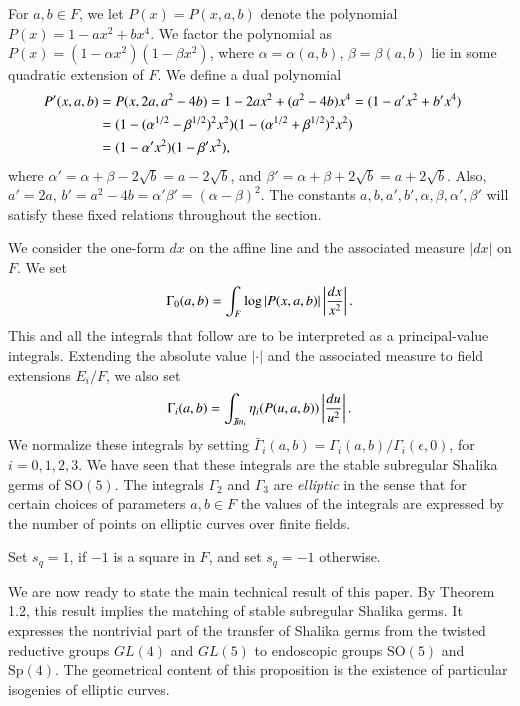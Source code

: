 \documentclass{amsart}
\newcommand\leftd[1]{\left | {d#1\over #1^2}\right |}
\newcommand\leftdx{\leftd x}
\newcommand\leftdu{\leftd u}
\newcommand\Imm{{\mathcal I\hskip-.2em m}}
\newcommand\bGamma{\bar\Gamma}
\begin{document}
For $a,b\in F$, we let $P(x) = P(x,a,b)$ denote the polynomial
$P(x) = 1-ax^2 + bx^4$.  We factor the polynomial as
$P(x) = (1-\alpha x^2)(1-\beta x^2)$, where $\alpha=\alpha(a,b)$,
$\beta=\beta(a,b)$ lie in some quadratic extension of $F$.
We define a dual polynomial 
\begin{align*}
P'(x,a,b) &= P(x,2a,a^2-4b) = 1-2ax^2 + (a^2-4b)x^4 = (1-a'x^2 + b'x^4)\cr
	  &= (1-(\alpha^{1/2} - \beta^{1/2})^2x^2)
                (1-(\alpha^{1/2}+\beta^{1/2})^2x^2)\cr
	  &= (1-\alpha'x^2)(1-\beta'x^2),
\end{align*}
where $\alpha' = \alpha+\beta-2\sqrt{b} = a-2\sqrt{b}$, and
$\beta' = \alpha+\beta+2\sqrt{b} = a+2\sqrt{b}$.  Also,
$a'=2a$, $b'=a^2-4b = \alpha'\beta'=(\alpha-\beta)^2$.
The constants $a,b,a',b',\alpha,\beta,\alpha',\beta'$ will 
satisfy these fixed relations throughout the section.

We consider the one-form $dx$ on the affine line and the associated
measure $|dx|$ on $F$.  We set
$$\Gamma_0(a,b) = \int_{F} \log|P(x,a,b)| \leftdx.$$
This and all the integrals that follow  are
to be interpreted as a principal-value integrals.
Extending the absolute value $|\cdot|$ and the associated measure
to field extensions $E_i/F$, we also set
$$\Gamma_i(a,b) = \int_{\Imm_i} \eta_i(P(u,a,b))\leftdu.$$
We normalize these integrals by setting $\bGamma_i(a,b) =
\Gamma_i(a,b)/\Gamma_i(\epsilon,0)$, for $i=0,1,2,3$.
We have seen that these integrals are the stable
subregular Shalika germs of $\text{SO}(5)$.
The integrals $\Gamma_2$ and $\Gamma_3$ are {\it elliptic} in the
sense that for certain choices of parameters $a,b\in F$ the values
of the integrals are expressed by the number of points on elliptic
curves over finite fields.

Set $s_q = 1$, if $-1$ is a square in $F$, and set $s_q=-1$ otherwise.

We are now ready to state the main technical result of this paper.  
By Theorem 1.2, this result implies the matching of stable
subregular Shalika germs.
It expresses
the nontrivial part of the transfer of Shalika
germs from the twisted reductive groups $GL(4)$ and $GL(5)$ to 
endoscopic groups $\text{SO}(5)$ and $\text{Sp}(4)$.  The geometrical
content of this proposition is the existence of particular isogenies of
elliptic curves.
\bigskip
\end{document}
